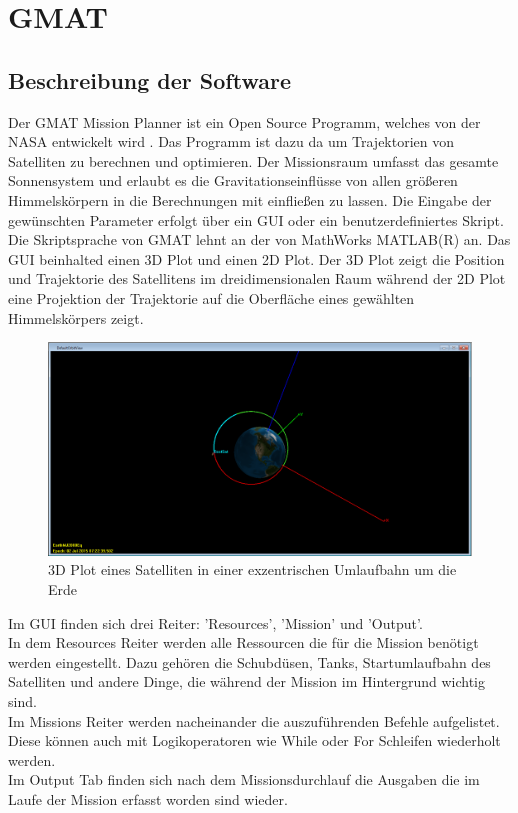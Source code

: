 			
\section{GMAT}
		\subsection{Beschreibung der Software}
		Der GMAT Mission Planner ist ein Open Source Programm, welches von der NASA entwickelt wird \cite{Hughes.}. Das Programm ist dazu da um Trajektorien von Satelliten zu berechnen und optimieren. Der Missionsraum umfasst das gesamte Sonnensystem und erlaubt es die Gravitationseinflüsse von allen größeren Himmelskörpern in die Berechnungen mit einfließen zu lassen. 
Die Eingabe der gewünschten Parameter erfolgt über ein GUI oder ein benutzerdefiniertes Skript. Die Skriptsprache von GMAT lehnt an der von MathWorks MATLAB(R) an.
Das GUI beinhalted einen 3D Plot und einen 2D Plot. Der 3D Plot zeigt die Position und Trajektorie des Satellitens im dreidimensionalen Raum während der 2D Plot eine Projektion der Trajektorie auf die Oberfläche eines gewählten Himmelskörpers zeigt.

\begin{figure}[!h]
	\centering
		\includegraphics[width=1.00\textwidth]{graphics/GMAT/GMAT_OrbitView2.PNG}
		\caption{3D Plot eines Satelliten in einer exzentrischen Umlaufbahn um die Erde}
			\label{fig:OrbitView2}
\end{figure}


Im GUI finden sich drei Reiter: ’Resources’, ’Mission’ und ’Output’.\\
In dem Resources Reiter werden alle Ressourcen die für die Mission benötigt werden eingestellt. Dazu gehören die Schubdüsen, Tanks, Startumlaufbahn des Satelliten und andere Dinge, die während der Mission im Hintergrund wichtig sind.\\
Im Missions Reiter werden nacheinander die auszuführenden Befehle aufgelistet. Diese können auch mit Logikoperatoren wie While oder For Schleifen wiederholt werden.\\
Im Output Tab finden sich nach dem Missionsdurchlauf die Ausgaben die im Laufe der Mission erfasst worden sind wieder. 



